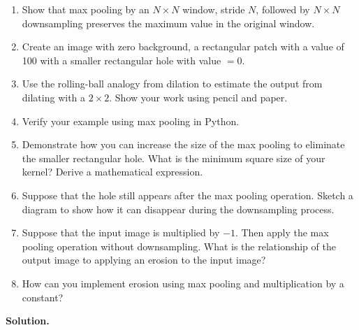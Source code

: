 \documentclass[11pt]{article}
\begin{document}
	\begin{enumerate}[label=\textbf{\Alph*.}, leftmargin=1.2cm]
		
		\item Show that max pooling by an $N \times N$ window, stride $N$, followed by $N \times N$ downsampling preserves the maximum value in the original window.
		
		\item Create an image with zero background, a rectangular patch with a value of 100 with a smaller rectangular hole with value $=0$.
		
		\item Use the rolling-ball analogy from dilation to estimate the output from dilating with a $2 \times 2$. Show your work using pencil and paper.
		
		\item Verify your example using max pooling in Python.
		
		\item Demonstrate how you can increase the size of the max pooling to eliminate the smaller rectangular hole. What is the minimum square size of your kernel? Derive a mathematical expression.
		
		\item Suppose that the hole still appears after the max pooling operation. Sketch a diagram to show how it can disappear during the downsampling process.
		
		\item Suppose that the input image is multiplied by $-1$. Then apply the max pooling operation without downsampling. What is the relationship of the output image to applying an erosion to the input image?
		
		\item How can you implement erosion using max pooling and multiplication by a constant?
		
	\end{enumerate}
	
	\vspace{1em}
	\noindent\textbf{Solution.}
	
\end{document}

